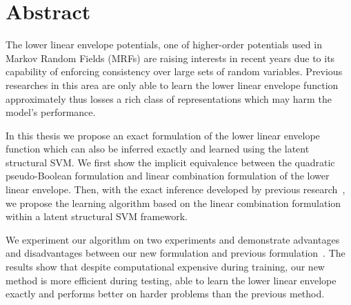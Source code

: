 
\chapter*{Abstract}
\label{cha:abstract}

The lower linear envelope potentials, one of higher-order
potentials used in Markov Random Fields (MRFs) are raising
interests in recent years due to its capability of enforcing
consistency over large sets of random variables. Previous
researches in this area are only able to learn the lower linear
envelope function approximately thus losses a rich class of
representations which may harm the model's performance.

In this thesis we propose an exact formulation of the lower
linear envelope function which can also be inferred exactly and
learned using the latent structural SVM. We first show the
implicit equivalence between the quadratic pseudo-Boolean
formulation and linear combination formulation of the lower
linear envelope. Then, with the exact inference developed by
previous research~\cite{gouldlearning}, we propose the learning
algorithm based on the linear combination formulation within a
latent structural SVM framework.

We experiment our algorithm on two experiments and demonstrate
advantages and disadvantages between our new formulation and
previous formulation~\cite{gouldlearning,Gould:ICML2011}. The
results show that despite computational expensive during
training, our new method is more efficient during testing, able
to learn the lower linear envelope exactly and performs better on
harder problems than the previous method.


